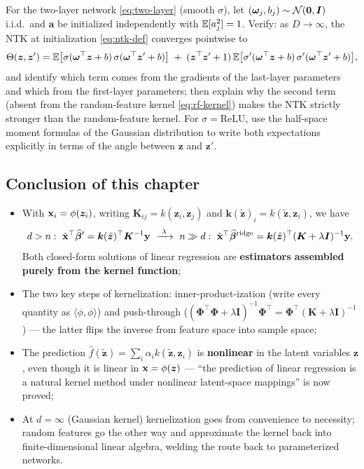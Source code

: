 \begin{exercise}\label{ex:ntk}
For the two-layer network \eqref{eq:two-layer} (smooth $\sigma$), let $(\bm{\omega}_j, b_j) \sim \mathcal{N}(\mathbf{0}, \bm{I})$ i.i.d.\ and $\bm{a}$ be initialized independently with $\mathbb{E}[a_j^2] = 1$. Verify: as $D \to \infty$, the NTK at initialization \eqref{eq:ntk-def} converges pointwise to
\[
  \Theta(\bm{z},\bm{z}') = \mathbb{E}\big[ \sigma(\bm{\omega}^\top\bm{z}+b)\,\sigma(\bm{\omega}^\top\bm{z}'+b) \big] \;+\; (\bm{z}^\top\bm{z}' + 1)\, \mathbb{E}\big[ \sigma'(\bm{\omega}^\top\bm{z}+b)\,\sigma'(\bm{\omega}^\top\bm{z}'+b) \big],
\]
and identify which term comes from the gradients of the last-layer parameters and which from the first-layer parameters; then explain why the second term (absent from the random-feature kernel \eqref{eq:rf-kernel}) makes the NTK strictly stronger than the random-feature kernel. For $\sigma = \mathrm{ReLU}$, use the half-space moment formulas of the Gaussian distribution to write both expectations explicitly in terms of the angle between $\bm{z}$ and $\bm{z}'$.
\end{exercise}

\subsection{Conclusion of this chapter}\label{sec:kernel-conclusion}

\begin{keybox}[Takeaways]
\begin{itemize}
  \item With $\mathbf{x}_i = \phi(\bm{z}_i)$, writing $\bm{K}_{ij} = k(\bm{z}_i,\bm{z}_j)$ and $\bm{k}(\tilde{\bm{z}})_i = k(\tilde{\bm{z}}, \bm{z}_i)$, we have
  \[
    d > n:\ \tilde{\x}^\top \widehat{\bbeta}' = \bm{k}(\tilde{\bm{z}})^\top \bm{K}^{-1} \y
    \ \xrightarrow{\ \lambda\ }\ 
    n \gg d:\ \tilde{\x}^\top \bhat^{\mathrm{ridge}} = \bm{k}(\tilde{\bm{z}})^\top (\bm{K} + \lambda \bm{I})^{-1} \y .
  \]
  Both closed-form solutions of linear regression are \textbf{estimators assembled purely from the kernel function};
  \item The two key steps of kernelization: inner-product-ization (write every quantity as $\langle\phi,\phi\rangle$) and push-through ($(\bm{\Phi}^\top\bm{\Phi} + \lambda\bm{I})^{-1}\bm{\Phi}^\top = \bm{\Phi}^\top(\bm{K} + \lambda\bm{I})^{-1}$) --- the latter flips the inverse from feature space into sample space;
  \item The prediction $\hat{f}(\tilde{\bm{z}}) = \sum_i \alpha_i k(\tilde{\bm{z}}, \bm{z}_i)$ is \textbf{nonlinear} in the latent variables $\bm{z}$, even though it is linear in $\mathbf{x} = \phi(\bm{z})$ --- ``the prediction of linear regression is a natural kernel method under nonlinear latent-space mappings'' is now proved;
  \item At $d = \infty$ (Gaussian kernel) kernelization goes from convenience to necessity; random features go the other way and approximate the kernel back into finite-dimensional linear algebra, welding the route back to parameterized networks.
\end{itemize}
\end{keybox}

